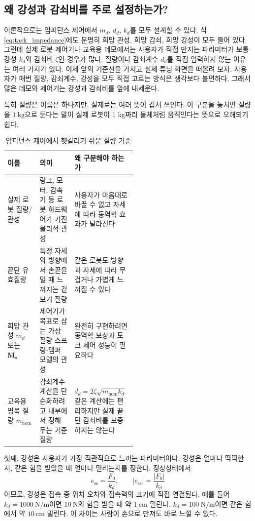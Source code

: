 \subsection{왜 강성과 감쇠비를 주로 설정하는가?}

이론적으로는 임피던스 제어에서 $m_d$, $d_d$, $k_d$를 모두 설계할 수 있다.
식 \eqref{eq:task_impedance}에도 분명히 희망 관성, 희망 감쇠, 희망 강성이 모두 들어 있다.
그런데 실제 로봇 제어기나 교육용 데모에서는 사용자가 직접 만지는 파라미터가 보통 강성 $k_d$와 감쇠비 $\zeta$인 경우가 많다.
질량이나 감쇠계수 $d_d$를 직접 입력하지 않는 이유는 여러 가지가 있다.
이제 앞의 기준선을 가지고 실제 튜닝 화면을 떠올려 보자.
사용자가 매번 질량, 감쇠계수, 강성을 모두 직접 고르는 방식은 생각보다 불편하다.
그래서 많은 데모와 제어기는 강성과 감쇠비를 앞에 내세운다.

특히 질량은 이름은 하나지만, 실제로는 여러 뜻이 겹쳐 쓰인다.
이 구분을 놓치면 질량을 $1~\mathrm{kg}$으로 둔다는 말이 실제 로봇이 1 kg짜리 물체처럼 움직인다는 뜻으로 오해되기 쉽다.
\begin{table}[!htbp]
  \centering
  \caption{임피던스 제어에서 헷갈리기 쉬운 질량 기준}
  \small
  \setlength{\tabcolsep}{4pt}
  \begin{tabularx}{\linewidth}{@{}>{\raggedright\arraybackslash}p{0.25\linewidth}>{\raggedright\arraybackslash}p{0.27\linewidth}>{\raggedright\arraybackslash}X@{}}
    \toprule
    이름 & 의미 & 왜 구분해야 하는가 \\
    \midrule
    실제 로봇 질량/관성 & 링크, 모터, 감속기 등 로봇 하드웨어가 가진 물리적 관성 & 사용자가 마음대로 바꿀 수 없고 자세에 따라 동역학 효과가 달라진다 \\
    끝단 유효질량 & 특정 자세와 방향에서 손끝을 밀 때 느껴지는 겉보기 질량 & 같은 로봇도 방향과 자세에 따라 무겁거나 가볍게 느껴질 수 있다 \\
    희망 관성 $m_d$ 또는 $\bm{M}_d$ & 제어기가 목표로 삼는 가상 질량-스프링-댐퍼 모델의 관성 & 완전히 구현하려면 동역학 보상과 토크 제어 성능이 필요하다 \\
    교육용 명목 질량 $m_{\mathrm{nom}}$ & 감쇠계수 계산을 단순화하려고 내부에서 정해 두는 기준 질량 & $d_d=2\zeta\sqrt{m_{\mathrm{nom}}k_d}$ 같은 계산에는 편리하지만 실제 끝단 감쇠비를 보증하지는 않는다 \\
    \bottomrule
  \end{tabularx}
\end{table}

첫째, 강성은 사용자가 가장 직관적으로 느끼는 파라미터이다.
강성은 얼마나 딱딱한지, 같은 힘을 받았을 때 얼마나 밀리는지를 정한다.
정상상태에서
\begin{equation}
  e_{\mathrm{ss}}=\frac{F_0}{k_d},
  \qquad
  |e_{\mathrm{ss}}|=\frac{|F_0|}{k_d}
\end{equation}
이므로, 강성은 접촉 중 위치 오차와 접촉력의 크기에 직접 연결된다.
예를 들어 $k_d=1000~\mathrm{N/m}$이면 $10~\mathrm{N}$의 힘을 받을 때 약 $1~\mathrm{cm}$ 밀린다.
$k_d=100~\mathrm{N/m}$이면 같은 힘에서 약 $10~\mathrm{cm}$ 밀린다.
이 차이는 사람이 손으로 만져도 바로 느낄 수 있다.

